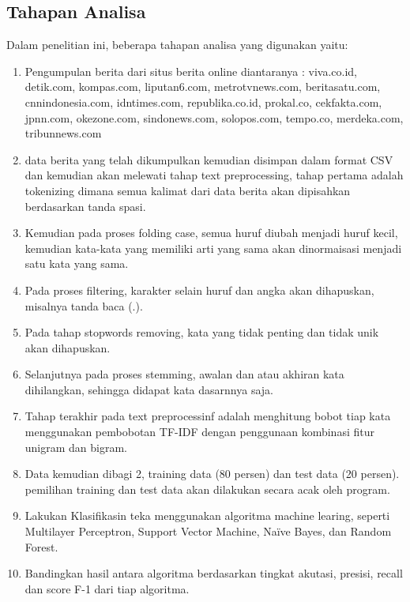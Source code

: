 \documentclass{article}
\begin{document}
\subsection{Tahapan Analisa}
Dalam penelitian ini, beberapa tahapan analisa yang digunakan yaitu:
\begin{enumerate}[{a.}]
\item Pengumpulan berita dari situs berita online diantaranya : viva.co.id, detik.com, kompas.com, liputan6.com, metrotvnews.com, 
beritasatu.com, cnnindonesia.com, idntimes.com, republika.co.id, prokal.co, 
cekfakta.com, jpnn.com, okezone.com, sindonews.com, solopos.com, 
tempo.co, merdeka.com, tribunnews.com

\item data berita yang telah dikumpulkan kemudian disimpan dalam format CSV dan kemudian akan melewati tahap text preprocessing, tahap pertama adalah 
tokenizing dimana semua kalimat dari data berita akan dipisahkan 
berdasarkan tanda spasi.

\item Kemudian pada proses folding case, semua huruf diubah menjadi huruf kecil, kemudian kata-kata yang memiliki arti yang sama akan dinormaisasi menjadi 
satu kata yang sama.

\item Pada proses filtering, karakter selain huruf dan angka akan dihapuskan, misalnya tanda baca (.).

\item Pada tahap stopwords removing, kata yang tidak penting dan tidak unik akan  dihapuskan.

\item Selanjutnya pada proses stemming, awalan dan atau akhiran kata dihilangkan, sehingga didapat kata dasarnnya saja.

\item Tahap terakhir pada text preprocessinf adalah menghitung bobot tiap kata menggunakan pembobotan TF-IDF dengan penggunaan kombinasi fitur 
unigram dan bigram.

\item Data kemudian dibagi 2, training data (80 persen) dan test data (20 persen). pemilihan training dan test data akan dilakukan secara acak oleh program.

\item Lakukan Klasifikasin teka menggunakan algoritma machine learing, seperti Multilayer Perceptron, Support Vector Machine, Naïve Bayes, dan Random Forest.

\item Bandingkan hasil antara algoritma berdasarkan tingkat akutasi, presisi, recall dan score F-1 dari tiap algoritma.
\end{enumerate}
\end{document}
